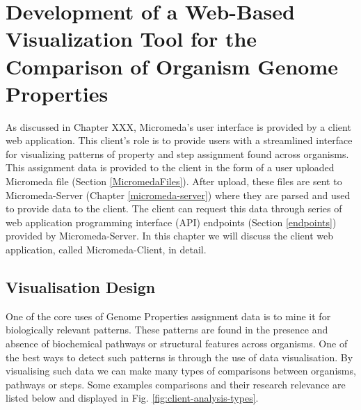 \chapter{Development of a Web-Based Visualization Tool for the Comparison of Organism Genome Properties} \label{micromeda-client}

As discussed in Chapter XXX, Micromeda's user interface is provided by a client web application. This client's role is to provide users with a streamlined interface for visualizing patterns of property and step assignment found across organisms. This assignment data is provided to the client in the form of a user uploaded Micromeda file (Section \ref{MicromedaFiles}). After upload, these files are sent to Micromeda-Server (Chapter \ref{micromeda-server}) where they are parsed and used to provide data to the client. The client can request this data through series of web application programming interface (API) endpoints (Section \ref{endpoints}) provided by Micromeda-Server. In this chapter we will discuss the client web application, called Micromeda-Client, in detail.

\section{Visualisation Design} \label{visualization-design}

One of the core uses of Genome Properties assignment data is to mine it for biologically relevant patterns. These patterns are found in the presence and absence of biochemical pathways or structural features across organisms. One of the best ways to detect such patterns is through the use of data visualisation. By visualising such data we can make many types of comparisons between organisms, pathways or steps. Some examples comparisons and their research relevance are listed below and displayed in Fig. \ref{fig:client-analysis-types}. 

